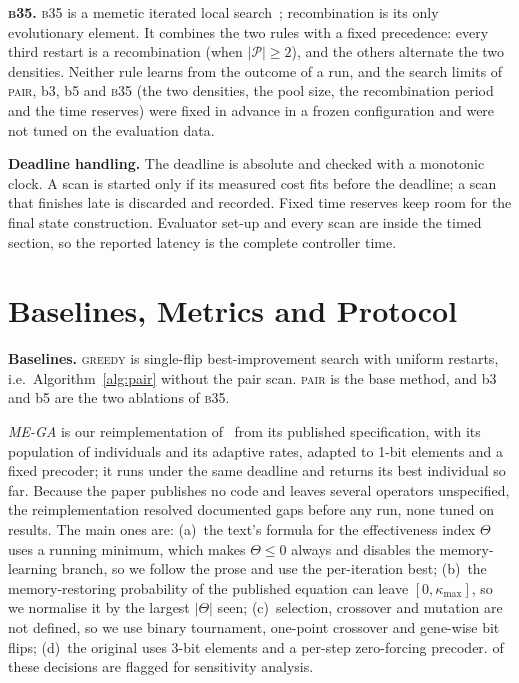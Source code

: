 \documentclass[runningheads]{llncs}
\newcommand{\bts}{\textsc{b35}}
\begin{document}
\textbf{\bts{}.} \bts{} is a memetic iterated local search~\cite{lourenco2010ils,merz2004memetic}; recombination is its only evolutionary element. It combines the two rules with a fixed precedence: every third restart is a recombination (when $|\mathcal P|\ge2$), and the others alternate the two densities. Neither rule learns from the outcome of a run, and the search limits of \textsc{pair}, b3, b5 and \bts{} (the two densities, the pool size, the recombination period and the time reserves) were fixed in advance in a frozen configuration and were not tuned on the evaluation data.

\textbf{Deadline handling.} The deadline is absolute and checked with a monotonic clock. A scan is started only if its measured cost fits before the deadline; a scan that finishes late is discarded and recorded. Fixed time reserves keep room for the final state construction. Evaluator set-up and every scan are inside the timed section, so the reported latency is the complete controller time.

\section{Baselines, Metrics and Protocol}\label{sec:protocol}
\textbf{Baselines.} \textsc{greedy} is single-flip best-improvement search with uniform restarts, i.e.\ Algorithm~\ref{alg:pair} without the pair scan. \textsc{pair} is the base method, and b3 and b5 are the two ablations of \bts{}.

\emph{ME-GA} is our reimplementation of~\cite{zardi2024memory} from its published specification, with its population of  individuals and its adaptive rates, adapted to 1-bit elements and a fixed precoder; it runs under the same deadline and returns its best individual so far. Because the paper publishes no code and leaves several operators unspecified, the reimplementation resolved  documented gaps before any run, none tuned on results. The main ones are: (a)~the text's formula for the effectiveness index $\Theta$ uses a running minimum, which makes $\Theta\le0$ always and disables the memory-learning branch, so we follow the prose and use the per-iteration best; (b)~the memory-restoring probability of the published equation can leave $[0,\kappa_{\max}]$, so we normalise it by the largest $|\Theta|$ seen; (c)~selection, crossover and mutation are not defined, so we use binary tournament, one-point crossover and gene-wise bit flips; (d)~the original uses 3-bit elements and a per-step zero-forcing precoder.  of these decisions are flagged for sensitivity analysis.
\end{document}

